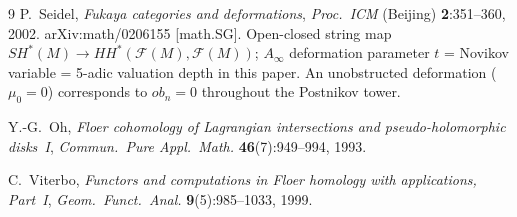 \documentclass[11pt,a4paper]{article}
\begin{document}
\begin{thebibliography}{9}
  P.~Seidel,
  \emph{Fukaya categories and deformations},
  \emph{Proc.\ ICM} (Beijing) \textbf{2}:351--360, 2002.
  arXiv:math/0206155 [math.SG].
  \newline
  Open-closed string map $SH^*(M)\to HH^*(\mathcal{F}(M),\mathcal{F}(M))$;
  $A_\infty$ deformation parameter $t$ = Novikov variable =
  5-adic valuation depth in this paper.
  An unobstructed deformation ($\mu_0=0$) corresponds to $ob_n=0$
  throughout the Postnikov tower.

  Y.-G.~Oh,
  \emph{Floer cohomology of Lagrangian intersections and
  pseudo-holomorphic disks~I},
  \emph{Commun.\ Pure Appl.\ Math.} \textbf{46}(7):949--994, 1993.

  C.~Viterbo,
  \emph{Functors and computations in Floer homology with applications, Part~I},
  \emph{Geom.\ Funct.\ Anal.} \textbf{9}(5):985--1033, 1999.

\end{thebibliography}
\end{document}
